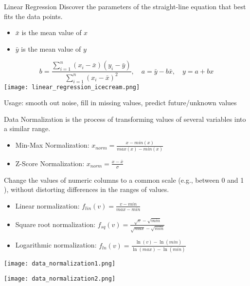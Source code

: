 \begin{definition}{Linear Regression}
    Discover the parameters of the straight-line equation that best fits the data points.
    \begin{itemize}
        \item $\bar{x}$ is the mean value of $x$
        \item $\bar{y}$ is the mean value of $y$
    \end{itemize}
    $$
    b=\frac{\sum_{i=1}^n\left(x_i-\bar{x}\right)\left(y_i-\bar{y}\right)}{\sum_{i=1}^n\left(x_i-\bar{x}\right)^2}, \quad a=\bar{y}-b \bar{x}, \quad y=a+b x
    $$
    \texttt{[image: linear\_regression\_icecream.png]}

    Usage: smooth out noise, fill in missing values, predict future/unknown values
\end{definition}

\begin{definition}{Data Normalization}
    is the process of transforming values of several variables into a similar range.
    \begin{itemize}
        \item Min-Max Normalization: $x_{norm} = \frac{x - min(x)}{max(x) - min(x)}$
        \item Z-Score Normalization: $x_{norm} = \frac{x - \bar{x}}{\sigma}$
    \end{itemize}
    
    Change the values of numeric columns to a common scale (e.g., between 0 and 1 ), without distorting differences in the ranges of values.
    \begin{itemize}
        \item Linear normalization: $f_{lin}(v) = \frac{v - min}{max - min}$
        \item Square root normalization: $f_{sq}(v) = \frac{\sqrt{v} - \sqrt{min}}{\sqrt{max} - \sqrt{min}}$
        \item Logarithmic normalization: $f_{ln}(v) = \frac{\ln(v) - \ln(min)}{\ln(max) - \ln(min)}$
    \end{itemize}

    \texttt{[image: data\_normalization1.png]}

    \texttt{[image: data\_normalization2.png]}
\end{definition}

